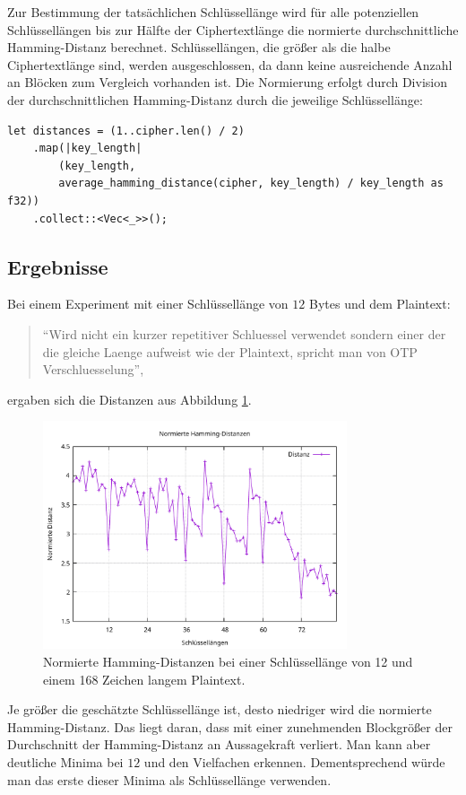 Zur Bestimmung der tatsächlichen Schlüssellänge wird für alle potenziellen Schlüssellängen bis zur Hälfte der Ciphertextlänge die normierte durchschnittliche Hamming-Distanz berechnet. Schlüssellängen, die größer als die halbe Ciphertextlänge sind, werden ausgeschlossen, da dann keine ausreichende Anzahl an Blöcken zum Vergleich vorhanden ist. Die Normierung erfolgt durch Division der durchschnittlichen Hamming-Distanz durch die jeweilige Schlüssellänge:
\vspace*{1em}
\begin{verbatim}
let distances = (1..cipher.len() / 2)
    .map(|key_length|
        (key_length, 
        average_hamming_distance(cipher, key_length) / key_length as f32))
    .collect::<Vec<_>>();
\end{verbatim}

\subsection*{Ergebnisse}
Bei einem Experiment mit einer Schlüssellänge von $12$ Bytes und dem Plaintext:
\begin{quote}
"`Wird nicht ein kurzer repetitiver Schluessel verwendet sondern einer der
die gleiche Laenge aufweist wie der Plaintext, spricht man von OTP
Verschluesselung"',
\end{quote}
ergaben sich die Distanzen aus Abbildung \ref{fig:avg_hamming_distances}.
\begin{figure}[h]
    \centering
    \includegraphics[width=0.8\textwidth]{img/plots/norm_hd_key_12.pdf}
    \caption{Normierte Hamming-Distanzen bei einer Schlüssellänge von 12 und einem 
    168 Zeichen langem Plaintext.}
    \label{fig:avg_hamming_distances}
\end{figure}
Je größer die geschätzte Schlüssellänge ist, desto niedriger wird die normierte 
Hamming-Distanz. Das liegt daran, dass mit einer zunehmenden Blockgrößer der
Durchschnitt der Hamming-Distanz an Aussagekraft verliert. Man kann aber deutliche
Minima bei $12$ und den Vielfachen erkennen. Dementsprechend würde man das erste
dieser Minima als Schlüssellänge verwenden.